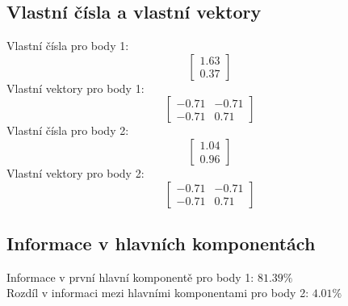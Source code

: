 \subsection{Vlastní čísla a vlastní vektory}
Vlastní čísla pro body 1:
\[
\begin{bmatrix}
1.63 \\
0.37
\end{bmatrix}
\]
Vlastní vektory pro body 1:
\[
\begin{bmatrix}
-0.71 & -0.71 \\
-0.71 & 0.71
\end{bmatrix}
\]
Vlastní čísla pro body 2:
\[
\begin{bmatrix}
1.04 \\
0.96
\end{bmatrix}
\]
Vlastní vektory pro body 2:
\[
\begin{bmatrix}
-0.71 & -0.71 \\
-0.71 & 0.71
\end{bmatrix}
\]
\subsection{Informace v hlavních komponentách}
Informace v první hlavní komponentě pro body 1: \(81.39\%\)\\
Rozdíl v informaci mezi hlavními komponentami pro body 2: \(4.01\%\)
